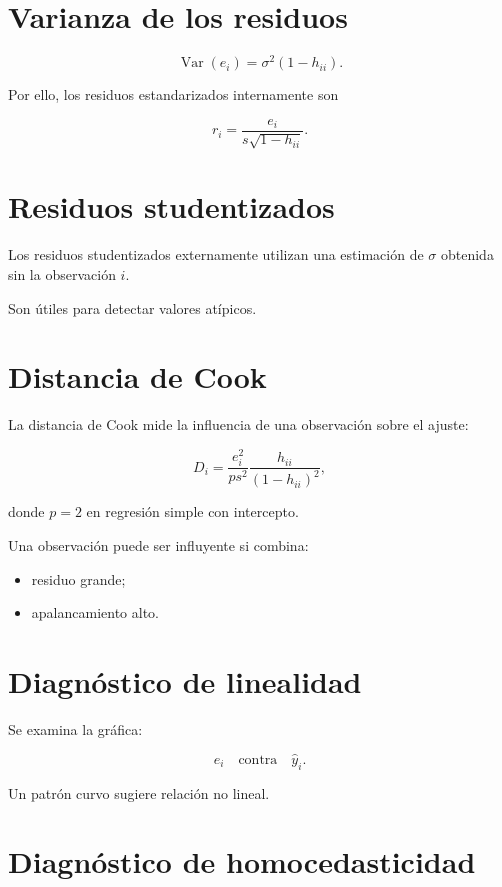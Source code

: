 \documentclass[
  spanish,
  11pt,
  letterpaper,
  DIV=11,
  numbers=noendperiod]{scrreprt}
\providecommand{\tightlist}{%
  \setlength{\itemsep}{0pt}\setlength{\parskip}{0pt}}
\theoremstyle{definition}
\theoremstyle{plain}
\theoremstyle{definition}
\theoremstyle{remark}
\begin{document}
\section{Varianza de los residuos}\label{varianza-de-los-residuos}

\[
\operatorname{Var}(e_i)
=
\sigma^2(1-h_{ii}).
\]

Por ello, los residuos estandarizados internamente son

\[
r_i
=
\frac{
e_i
}{
s\sqrt{1-h_{ii}}
}.
\]

\section{Residuos studentizados}\label{residuos-studentizados}

Los residuos studentizados externamente utilizan una estimación de
\(\sigma\) obtenida sin la observación \(i\).

Son útiles para detectar valores atípicos.

\section{Distancia de Cook}\label{distancia-de-cook}

La distancia de Cook mide la influencia de una observación sobre el
ajuste:

\[
D_i
=
\frac{
e_i^2
}{
ps^2
}
\frac{
h_{ii}
}{
(1-h_{ii})^2
},
\]

donde \(p=2\) en regresión simple con intercepto.

Una observación puede ser influyente si combina:

\begin{itemize}
\tightlist
\item
  residuo grande;
\item
  apalancamiento alto.
\end{itemize}

\section{Diagnóstico de linealidad}\label{diagnuxf3stico-de-linealidad}

Se examina la gráfica:

\[
e_i
\quad
\text{contra}
\quad
\widehat{y}_i.
\]

Un patrón curvo sugiere relación no lineal.

\section{Diagnóstico de
homocedasticidad}\label{diagnuxf3stico-de-homocedasticidad}
\end{document}
